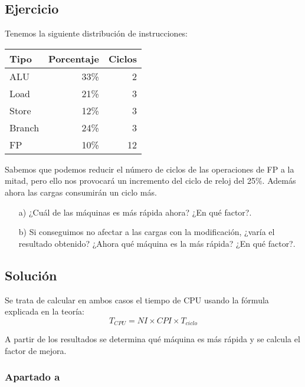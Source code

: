 \documentclass[12pt,onecolumn]{memoir}
\newenvironment{ejercicio}{%
    \def\FrameCommand{\fboxrule=\FrameRule\fboxsep=\FrameSep \fcolorbox{black}{metallic-green}}%
    \MakeFramed {\FrameRestore}}%
{\endMakeFramed}
\begin{document}
\begin{ejercicio}

  \subsection*{Ejercicio}
    
Tenemos la siguiente distribución de instrucciones:

\begin{center}
\begin{tabular}{lrr}
\hline
{\textbf{Tipo}} & {\textbf{Porcentaje}} & {\textbf{Ciclos}} \\
\hline
ALU & 33\% & 2 \\
Load & 21\% & 3 \\
Store & 12\% & 3 \\
Branch & 24\% & 3 \\
FP & 10\% & 12 \\
\hline
\end{tabular}
\end{center}

Sabemos que podemos reducir el número de ciclos de las operaciones
de FP a la mitad, pero ello nos provocará un incremento del ciclo
de reloj del 25\%. Además ahora las cargas consumirán un ciclo
más.

\begin{enumerate}

\item[a)] ¿Cuál de las máquinas es más rápida ahora? ¿En qué factor?.
\item[b)] Si conseguimos no afectar a las cargas con la modificación, ¿varía
el resultado obtenido? ¿Ahora qué máquina es la más rápida? ¿En
qué factor?.

\end{enumerate}

\subsection*{Solución}

Se trata de calcular en ambos casos el tiempo de CPU usando la fórmula explicada en la teoría:
\[ T_{CPU} = NI \times CPI \times T_{ciclo} \]

A partir de los resultados se determina qué máquina es más rápida y se calcula el factor de mejora.

\subsubsection*{Apartado a}


\end{ejercicio}
\end{document}
